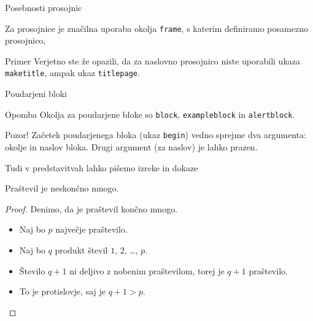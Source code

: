 \begin{frame}{Posebnosti prosojnic}

	Za prosojnice je značilna uporaba okolja \texttt{frame},
	s katerim definiramo posamezno prosojnico,
	\begin{exampleblock}{Primer}
		Verjetno ste že opazili, da za naslovno prosojnico niste uporabili
		ukaza \texttt{maketitle}, ampak ukaz \texttt{titlepage}.
	\end{exampleblock}
\end{frame}

\begin{frame}{Poudarjeni bloki}

		
		\begin{exampleblock}{Opomba}
			Okolja za poudarjene bloke so \texttt{block}, \texttt{exampleblock} in \texttt{alertblock}.
		\end{exampleblock}

		
		\begin{alertblock}{Pozor!}
			Začetek poudarjenega bloka (ukaz \texttt{begin}) vedno sprejme 
			dva argumenta: okolje in naslov bloka.
			Drugi argument (za naslov) je lahko prazen. 
		\end{alertblock}

\end{frame}

\begin{frame}{Tudi v predstavitvah lahko pišemo izreke in dokaze}

	\begin{izrek}
	   Praštevil je neskončno mnogo.
	\end{izrek}
	\begin{proof}
	   Denimo, da je praštevil končno mnogo.
	   \begin{itemize}[<+->]
		  \item Naj bo \(p\) \alert<4>{največje} praštevilo.
		  \item Naj bo \(q\) produkt števil \(1\), \(2\), \ldots, \(p\).
		  \item Število \(q+1\) ni deljivo z nobenim praštevilom, torej je \(q+1\) praštevilo.
		  \item To je protislovje, saj je \(q+1>p\). \qedhere
	   \end{itemize}
	\end{proof}
 \end{frame}
 
